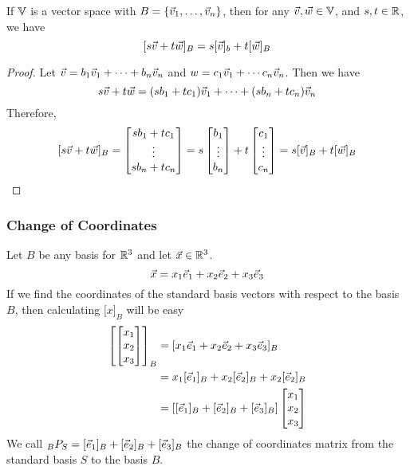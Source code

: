\documentclass[english, 12pt]{article}
\begin{document}
\begin{thrm}
If ${\mathbb{V}}$ is a vector space with $B = \{\vec{v}_1,\dots,\vec{v}_n\}$, then for any $\vec{v},\vec{w} \in {\mathbb{V}}$, and $s,t \in {\mathbb{R}}$, we have
\[\lbrack s \vec{v} + t \vec{w} \rbrack_B = s \lbrack \vec{v} \rbrack_b + t \lbrack \vec{w} \rbrack_B\]
\begin{proof}
Let $\vec{v} = b_1 \vec{v}_1 + \cdots + b_n \vec{v}_n$ and $w = c_1 \vec{v}_1 + \cdots c_n \vec{v}_n$. Then we have
\[s\vec{v} + t \vec{w} = (sb_1 + tc_1) \vec{v}_1 + \cdots + (sb_n + tc_n) \vec{v}_n\]
Therefore,
\[\lbrack s \vec{v} + t \vec{w} \rbrack_B = \begin{bmatrix} sb_1 + tc_1 \\ \vdots \\ sb_n + tc_n \end{bmatrix} = s \begin{bmatrix} b_1 \\ \vdots \\b_n \end{bmatrix} + t \begin{bmatrix} c_1 \\ \vdots \\c_n \end{bmatrix} = s \lbrack \vec{v} \rbrack_B + t \lbrack \vec{w} \rbrack_B\]
\end{proof}
\end{thrm}

\subsubsection{Change of Coordinates}

\begin{exmp}
Let $B$ be any basis for ${\mathbb{R}}^3$ and let $\vec{x} \in {\mathbb{R}}^3$.
\[\vec{x} = x_1 \vec{e}_1 + x_2 \vec{e}_2 + x_3 \vec{e}_3 \]
If we find the coordinates of the standard basis vectors with respect to the basis $B$, then calculating $\lbrack x \rbrack_B$ will be easy
\begin{align*}
\left\lbrack \begin{bmatrix} x_1 \\ x_2 \\x_3 \end{bmatrix} \right\rbrack_B &= \lbrack x_1 \vec{e}_1 + x_2 \vec{e}_2 + x_3 \vec{e}_3 \rbrack_B \\
&= x_1 \lbrack \vec{e}_1 \rbrack_B + x_2 \lbrack \vec{e}_2 \rbrack_B + x_2 \lbrack \vec{e}_2 \rbrack_B \\
&= \left \lbrack \lbrack \vec{e}_1 \rbrack_B + \lbrack \vec{e}_2 \rbrack_B + \lbrack \vec{e}_3 \rbrack_B \right \rbrack \begin{bmatrix} x_1 \\ x_2 \\ x_3 \end{bmatrix}
\end{align*}
We call $_BP_S = \lbrack \vec{e}_1 \rbrack_B + \lbrack \vec{e}_2 \rbrack_B + \lbrack \vec{e}_3 \rbrack_B$ the change of coordinates matrix from the standard basis $S$ to the basis $B$.
\end{exmp}
\end{document}

